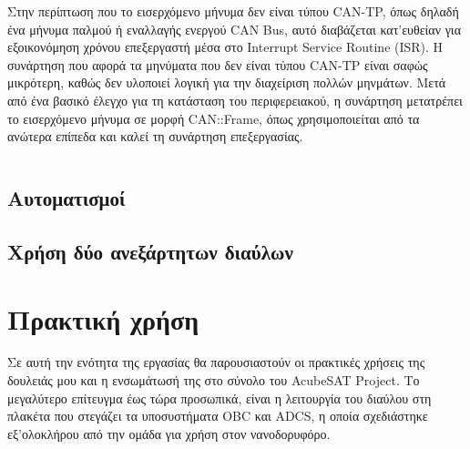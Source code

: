 \documentclass[a4paper,nobib,justified]{tufte-book}
\begin{document}
Στην περίπτωση που το εισερχόμενο μήνυμα δεν είναι τύπου CAN-TP, όπως δηλαδή ένα μήνυμα παλμού ή εναλλαγής ενεργού CAN Bus, αυτό διαβάζεται κατ'ευθείαν για εξοικονόμηση χρόνου επεξεργαστή μέσα στο Interrupt Service Routine (ISR). Η συνάρτηση που αφορά τα μηνύματα που δεν είναι τύπου CAN-TP είναι σαφώς μικρότερη, καθώς δεν υλοποιεί λογική για την διαχείριση πολλών μηνμάτων. Μετά από ένα βασικό έλεγχο για τη κατάσταση του περιφερειακού, η συνάρτηση μετατρέπει το εισερχόμενο μήνυμα σε μορφή CAN::Frame, όπως χρησιμοποιείται από τα ανώτερα επίπεδα και καλεί τη συνάρτηση επεξεργασίας.
\inputminted{c++}{code/examples/driver-non-tp-receiver.cpp}

\section{Αυτοματισμοί}

\section{Χρήση δύο ανεξάρτητων διαύλων}


\chapter{Πρακτική χρήση}
\label{usage}
Σε αυτή την ενότητα της εργασίας θα παρουσιαστούν οι πρακτικές χρήσεις της δουλειάς μου και η ενσωμάτωσή της στο σύνολο του AcubeSAT Project. Το μεγαλύτερο επίτευγμα έως τώρα προσωπικά, είναι η λειτουργία του διαύλου στη πλακέτα που στεγάζει τα υποσυστήματα OBC και ADCS, η οποία σχεδιάστηκε εξ'ολοκλήρου από την ομάδα για χρήση στον νανοδορυφόρο.
\end{document}
